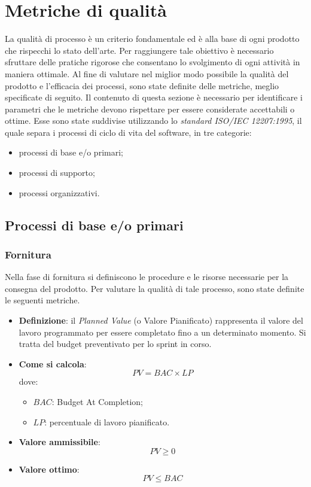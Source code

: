 \section{Metriche di qualità}
La qualità di processo è un criterio fondamentale ed è alla base di ogni prodotto che rispecchi lo stato dell'arte. Per raggiungere tale obiettivo è necessario sfruttare delle pratiche rigorose che consentano lo svolgimento di ogni attività in maniera ottimale. Al fine di valutare nel miglior modo possibile la qualità del prodotto e l'efficacia dei processi, sono state definite delle metriche, meglio specificate di seguito. Il contenuto di questa sezione è necessario per identificare i parametri che le metriche devono rispettare per essere considerate accettabili o ottime. Esse sono state suddivise utilizzando lo \textit{standard ISO/IEC 12207:1995}, il quale separa i processi di ciclo di vita del software, in tre categorie:
\begin{itemize}
	\item processi di base e/o primari;
	\item processi di supporto;
	\item processi organizzativi.
\end{itemize}

\subsection{Processi di base e/o primari}

\subsubsection{Fornitura}
Nella fase di fornitura si definiscono le procedure e le risorse necessarie per la consegna del prodotto. Per valutare la qualità di tale processo, sono state definite le seguenti metriche.

\hypertarget{1M}{}
\begin{itemize}
	\item \textbf{Definizione}: il \textit{Planned Value} (o Valore Pianificato) rappresenta il valore del lavoro programmato per essere completato fino a un determinato momento. Si tratta del budget preventivato per lo sprint in corso.
	\item \textbf{Come si calcola}: \begin{equation*}PV = BAC \times LP\end{equation*} dove:
		\begin{itemize}
			\item $BAC$: Budget At Completion;
			\item $LP$: percentuale di lavoro pianificato.
		\end{itemize}
	\item \textbf{Valore ammissibile}: \begin{equation*}PV \geq 0\end{equation*}
	\item \textbf{Valore ottimo}: \begin{equation*}PV \leq BAC\end{equation*}
\end{itemize}

